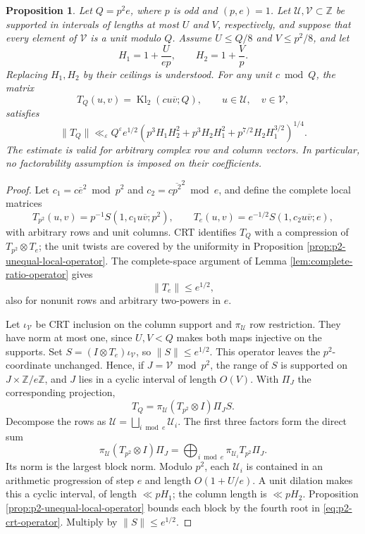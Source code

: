 \documentclass[12pt, a4paper]{amsart}
\numberwithin{equation}{section}
\newcommand{\ep}{\varepsilon}
\newcommand{\Z}{\mathbb{Z}}
\renewcommand{\bar}[1]{\overline{#1}}
\renewcommand{\le}{\leqslant}
\theoremstyle{plain}
\newtheorem{prop}[lem]{Proposition}
\begin{document}
\begin{prop}\label{prop:p2-crt-operator}
Let $Q=p^2e$, where $p$ is odd and $(p,e)=1$. Let $\mathcal U,\mathcal V\subset\Z$ be supported in intervals of lengths at most $U$ and $V$, respectively, and suppose that every element of $\mathcal V$ is a unit modulo $Q$. Assume $U\le Q/8$ and $V\le p^2/8$, and let
$$
H_1=1+\frac{U}{ep},
\qquad
H_2=1+\frac{V}{p}.
$$
Replacing $H_1,H_2$ by their ceilings is understood. For any unit $c\bmod Q$, the matrix
$$
T_Q(u,v)=\operatorname{Kl}_2(cu\bar v;Q),
\qquad
u\in\mathcal U,\quad v\in\mathcal V,
$$
satisfies
\begin{equation}\label{eq:p2-crt-operator}
\|T_Q\|
\ll_\ep Q^\ep e^{1/2}
\left(
p^3H_1H_2^2+p^3H_2H_1^2
+p^{7/2}H_2H_1^{3/2}\right)^{1/4}.
\end{equation}
The estimate is valid for arbitrary complex row and column vectors. In particular, no factorability assumption is imposed on their coefficients.
\end{prop}

\begin{proof}
Let $c_1=c\bar e^{2}\bmod {p^2}$ and $c_2=c\overline{p^2}^{2}\bmod e$, and define the complete local matrices
$$
T_{p^2}(u,v)
=p^{-1}S(1,c_1u\bar v;p^2),
\qquad
T_e(u,v)
=e^{-1/2}S(1,c_2u\bar v;e),
$$
with arbitrary rows and unit columns. CRT identifies $T_Q$ with a compression of $T_{p^2}\otimes T_e$; the unit twists are covered by the uniformity in Proposition \ref{prop:p2-unequal-local-operator}. The complete-space argument of Lemma \ref{lem:complete-ratio-operator} gives
\begin{equation}\label{eq:cofactor-norm}
\|T_e\|\le e^{1/2},
\end{equation}
also for nonunit rows and arbitrary two-powers in $e$.

Let $\iota_{\mathcal V}$ be CRT inclusion on the column support and $\pi_{\mathcal U}$ row restriction. They have norm at most one, since $U,V<Q$ makes both maps injective on the supports. Set $S=(I\otimes T_e)\iota_{\mathcal V}$, so $\|S\|\le e^{1/2}$. This operator leaves the $p^2$-coordinate unchanged. Hence, if $J=\mathcal V\bmod p^2$, the range of $S$ is supported on $J\times\Z/e\Z$, and $J$ lies in a cyclic interval of length $O(V)$. With $\Pi_J$ the corresponding projection,
$$
T_Q=\pi_{\mathcal U}(T_{p^2}\otimes I)\Pi_JS.
$$
Decompose the rows as $\mathcal U=\bigsqcup_{i\bmod e}\mathcal U_i$. The first three factors form the direct sum
$$
\pi_{\mathcal U}(T_{p^2}\otimes I)\Pi_J
=\bigoplus_{i\bmod e}\pi_{\mathcal U_i}T_{p^2}\Pi_J.
$$
Its norm is the largest block norm. Modulo $p^2$, each $\mathcal U_i$ is contained in an arithmetic progression of step $e$ and length $O(1+U/e)$. A unit dilation makes this a cyclic interval, of length $\ll pH_1$; the column length is $\ll pH_2$. Proposition \ref{prop:p2-unequal-local-operator} bounds each block by the fourth root in \eqref{eq:p2-crt-operator}. Multiply by $\|S\|\le e^{1/2}$.
\end{proof}
\end{document}

